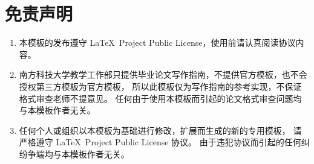 \section{免责声明}
\begin{enumerate}[label={\alph*)}]
\item 本模板的发布遵守 \LaTeX\ Project Public License，使用前请认真阅读协议内容。
\item 南方科技大学教学工作部只提供毕业论文写作指南，不提供官方模板，也不会授权第三方模板为官方模板，
  所以此模板仅为写作指南的参考实现，不保证格式审查老师不提意见。
  任何由于使用本模板而引起的论文格式审查问题均与本模板作者无关。
\item 任何个人或组织以本模板为基础进行修改，扩展而生成的新的专用模板，
  请严格遵守 \LaTeX\ Project Public License 协议。
  由于违犯协议而引起的任何纠纷争端均与本模板作者无关。
\end{enumerate}
